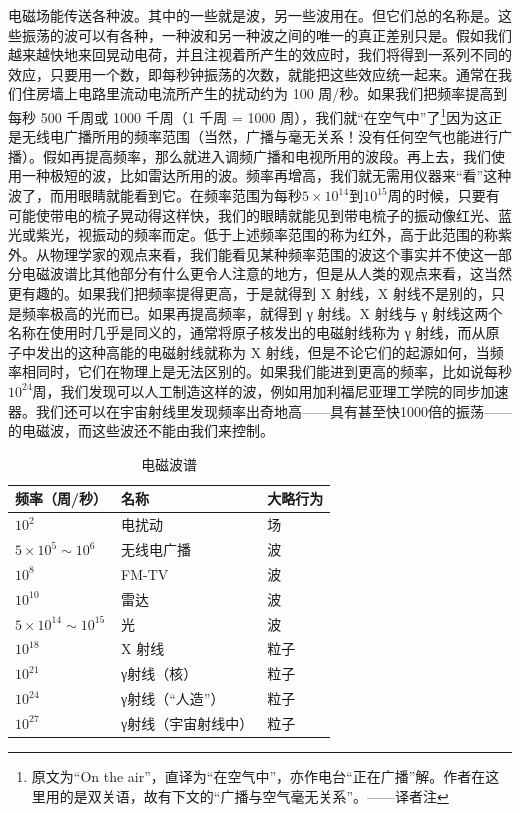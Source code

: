 电磁场能传送各种波。其中的一些就是波，另一些波用在。但它们总的名称是。这些振荡的波可以有各种，一种波和另一种波之间的唯一的真正差别只是。假如我们越来越快地来回晃动电荷，并且注视着所产生的效应时，我们将得到一系列不同的效应，只要用一个数，即每秒钟振荡的次数，就能把这些效应统一起来。通常在我们住房墙上电路里流动电流所产生的扰动约为 100 周/秒。如果我们把频率提高到每秒 500 千周或 1000 千周（1 千周 = 1000 周），我们就“在空气中”了\footnote{原文为“On the air”，直译为“在空气中”，亦作电台“正在广播”解。作者在这里用的是双关语，故有下文的“广播与空气毫无关系”。——译者注}因为这正是无线电广播所用的频率范围（当然，广播与毫无关系！没有任何空气也能进行广播）。假如再提高频率，那么就进入调频广播和电视所用的波段。再上去，我们使用一种极短的波，比如雷达所用的波。频率再增高，我们就无需用仪器来“看”这种波了，而用眼睛就能看到它。在频率范围为每秒$5\times10^{14}$到$10^{15}$周的时候，只要有可能使带电的梳子晃动得这样快，我们的眼睛就能见到带电梳子的振动像红光、蓝光或紫光，视振动的频率而定。低于上述频率范围的称为红外，高于此范围的称紫外。从物理学家的观点来看，我们能看见某种频率范围的波这个事实并不使这一部分电磁波谱比其他部分有什么更令人注意的地方，但是从人类的观点来看，这当然更有趣的。如果我们把频率提得更高，于是就得到 X 射线，X 射线不是别的，只是频率极高的光而已。如果再提高频率，就得到 γ 射线。X 射线与 γ 射线这两个名称在使用时几乎是同义的，通常将原子核发出的电磁射线称为 γ 射线，而从原子中发出的这种高能的电磁射线就称为 X 射线，但是不论它们的起源如何，当频率相同时，它们在物理上是无法区别的。如果我们能进到更高的频率，比如说每秒$10^{24}$周，我们发现可以人工制造这样的波，例如用加利福尼亚理工学院的同步加速器。我们还可以在宇宙射线里发现频率出奇地高——具有甚至快1000倍的振荡——的电磁波，而这些波还不能由我们来控制。

\begin{table}[H]
    \centering
    \caption{电磁波谱}
    \label{tab:电磁波谱}
    \medskip 
    \begin{tabular}{@{}lll@{}}
        \toprule
        频率（周/秒）                     & 名称         & 大略行为 \\ \midrule
        $10^{2}$                    & 电扰动        & 场    \\
        $5\times10^{5}\sim10^{6}$   & 无线电广播      & 波    \\
        $10^{8}$                    & FM-TV      & 波    \\
        $10^{10}$                   & 雷达         & 波    \\
        $5\times10^{14}\sim10^{15}$ & 光          & 波    \\
        $10^{18}$                   & X 射线       & 粒子   \\
        $10^{21}$                   & γ射线（核）     & 粒子   \\
        $10^{24}$                   & γ射线（“人造”）  & 粒子   \\
        $10^{27}$                   & γ射线（宇宙射线中） & 粒子  \\ \bottomrule
    \end{tabular}
\end{table}


